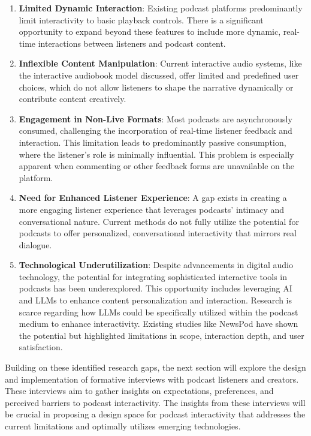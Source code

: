 \documentclass[12pt]{report}
\begin{document}
\begin{myfont}
        \begin{enumerate}
            \item \textbf{Limited Dynamic Interaction}: Existing podcast platforms predominantly limit interactivity to basic playback controls. There is a significant opportunity to expand beyond these features to include more dynamic, real-time interactions between listeners and podcast content.
            \item \textbf{Inflexible Content Manipulation}: Current interactive audio systems, like the interactive audiobook model discussed, offer limited and predefined user choices, which do not allow listeners to shape the narrative dynamically or contribute content creatively.
            \item \textbf{Engagement in Non-Live Formats}: Most podcasts are asynchronously consumed, challenging the incorporation of real-time listener feedback and interaction. This limitation leads to predominantly passive consumption, where the listener's role is minimally influential. This problem is especially apparent when commenting or other feedback forms are unavailable on the platform.
            \item \textbf{Need for Enhanced Listener Experience}: A gap exists in creating a more engaging listener experience that leverages podcasts' intimacy and conversational nature. Current methods do not fully utilize the potential for podcasts to offer personalized, conversational interactivity that mirrors real dialogue.
            \item \textbf{Technological Underutilization}: Despite advancements in digital audio technology, the potential for integrating sophisticated interactive tools in podcasts has been underexplored. This opportunity includes leveraging AI and LLMs to enhance content personalization and interaction. Research is scarce regarding how LLMs could be specifically utilized within the podcast medium to enhance interactivity. Existing studies like NewsPod have shown the potential but highlighted limitations in scope, interaction depth, and user satisfaction.
        \end{enumerate}
        
        \indent Building on these identified research gaps, the next section will explore the design and implementation of formative interviews with podcast listeners and creators. These interviews aim to gather insights on expectations, preferences, and perceived barriers to podcast interactivity. The insights from these interviews will be crucial in proposing a design space for podcast interactivity that addresses the current limitations and optimally utilizes emerging technologies.
        \clearpage


\end{myfont}
\end{document}
